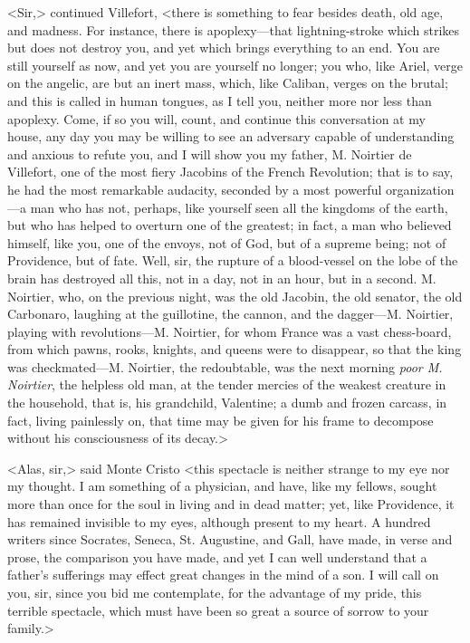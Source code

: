  <Sir,> continued Villefort, <there is something to fear besides death, old age, and madness. For instance, there is apoplexy—that lightning-stroke which strikes but does not destroy you, and yet which brings everything to an end. You are still yourself as now, and yet you are yourself no longer; you who, like Ariel, verge on the angelic, are but an inert mass, which, like Caliban, verges on the brutal; and this is called in human tongues, as I tell you, neither more nor less than apoplexy. Come, if so you will, count, and continue this conversation at my house, any day you may be willing to see an adversary capable of understanding and anxious to refute you, and I will show you my father, M. Noirtier de Villefort, one of the most fiery Jacobins of the French Revolution; that is to say, he had the most remarkable audacity, seconded by a most powerful organization—a man who has not, perhaps, like yourself seen all the kingdoms of the earth, but who has helped to overturn one of the greatest; in fact, a man who believed himself, like you, one of the envoys, not of God, but of a supreme being; not of Providence, but of fate. Well, sir, the rupture of a blood-vessel on the lobe of the brain has destroyed all this, not in a day, not in an hour, but in a second. M. Noirtier, who, on the previous night, was the old Jacobin, the old senator, the old Carbonaro, laughing at the guillotine, the cannon, and the dagger—M. Noirtier, playing with revolutions—M. Noirtier, for whom France was a vast chess-board, from which pawns, rooks, knights, and queens were to disappear, so that the king was checkmated—M. Noirtier, the redoubtable, was the next morning \textit{poor M. Noirtier}, the helpless old man, at the tender mercies of the weakest creature in the household, that is, his grandchild, Valentine; a dumb and frozen carcass, in fact, living painlessly on, that time may be given for his frame to decompose without his consciousness of its decay.> 

 <Alas, sir,> said Monte Cristo <this spectacle is neither strange to my eye nor my thought. I am something of a physician, and have, like my fellows, sought more than once for the soul in living and in dead matter; yet, like Providence, it has remained invisible to my eyes, although present to my heart. A hundred writers since Socrates, Seneca, St. Augustine, and Gall, have made, in verse and prose, the comparison you have made, and yet I can well understand that a father's sufferings may effect great changes in the mind of a son. I will call on you, sir, since you bid me contemplate, for the advantage of my pride, this terrible spectacle, which must have been so great a source of sorrow to your family.> 

